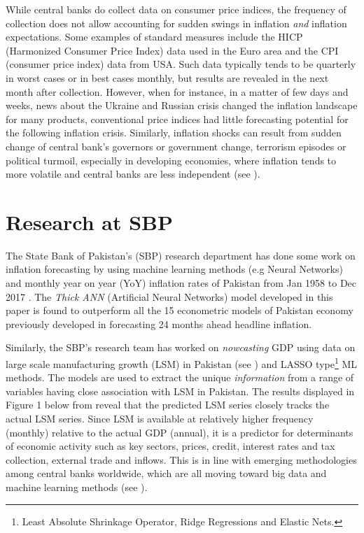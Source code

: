 \documentclass[12pt]{article}
\newcommand{\1}{\mathbbm 1}
\begin{document}
		
		
		
		While central banks do collect data on consumer price indices, the frequency of collection does not allow accounting for sudden swings in inflation \textit{and} inflation expectations. Some examples of standard measures include the HICP (Harmonized Consumer Price Index) data used in the Euro area and the CPI (consumer price index) data from USA. Such data typically tends to be quarterly in worst cases or in best cases monthly, but results are revealed in the next month after collection. However, when for instance, in a matter of few days and weeks, news about the Ukraine and Russian crisis changed the inflation landscape for many products, conventional price indices had little forecasting potential for the following inflation crisis. Similarly, inflation shocks can result from sudden change of central bank's governors or government change, terrorism episodes or political turmoil, especially in developing economies, where inflation tends to more volatile and central banks are less independent (see \cite{vuletin2011replacing}).
		
		
		\section{Research at SBP}
		
		
		
		The State Bank of Pakistan's (SBP) research department has done some work on inflation forecasting by using machine learning methods (e.g Neural Networks) and monthly year on year (YoY) inflation rates of Pakistan from Jan 1958 to Dec 2017 \cite{hanif2018thick}. The \textit{Thick ANN} (Artificial Neural Networks) model developed in this paper is found to outperform all the 15 econometric models of Pakistan economy previously developed in forecasting 24 months ahead headline inflation.
		
		Similarly, the SBP's research team has worked on \textit{nowcasting} GDP using data on large scale manufacturing growth (LSM) in Pakistan (see \cite{hussain2018nowcasting}) and LASSO type\footnote{Least Absolute Shrinkage Operator, Ridge Regressions and Elastic Nets.} ML methods. The models are used to extract the unique \textit{information} from a range of variables having close association with LSM in Pakistan. The results displayed in Figure 1 below from \cite{hussain2018nowcasting} reveal that the predicted LSM series closely tracks the actual LSM series. Since LSM is available at relatively higher frequency (monthly) relative to the actual GDP (annual), it is a predictor for determinants of economic activity such as key sectors, prices, credit, interest rates and tax collection, external trade and inflows. This is in line with emerging methodologies among central banks worldwide, which are all moving toward big data and machine learning methods (see \cite{doerr2021big}). 
		
\end{document}
